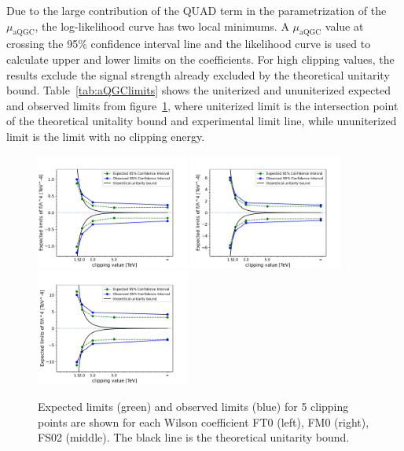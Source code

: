 Due to the large contribution of the QUAD term in the parametrization of the $\mu_{\mathrm{aQGC}}$, the log-likelihood curve has two local minimums.
A $\mu_{\mathrm{aQGC}}$ value at crossing the 95\% confidence interval line and the likelihood curve is used to calculate upper and lower limits on the coefficients. 
For high clipping values, the results exclude the signal strength already excluded by the theoretical unitarity bound.
Table~\ref{tab:aQGClimits} shows the uniterized and ununiterized expected and observed limits from figure~\ref{fig:aQGClimits}, where uniterized limit is the intersection point of the theoretical unitality bound and experimental limit line, while ununiterized limit is the limit with no clipping energy.
\begin{figure}[ht]
    \centering
    \includegraphics[width=0.45\textwidth]{figures/aQGC/ClippedFT0CI.pdf}
    	\includegraphics[width=0.45\textwidth]{figures/aQGC/ClippedFM0CI.pdf}
    	\includegraphics[width=0.45\textwidth]{figures/aQGC/ClippedFS02CI.pdf}
        \caption{Expected limits (green) and observed limits (blue) for 5 clipping points are shown for each Wilson coefficient FT0 (left), FM0 (right), FS02 (middle). The black line is the theoretical unitarity bound.}
        \label{fig:aQGClimits}
\end{figure}


